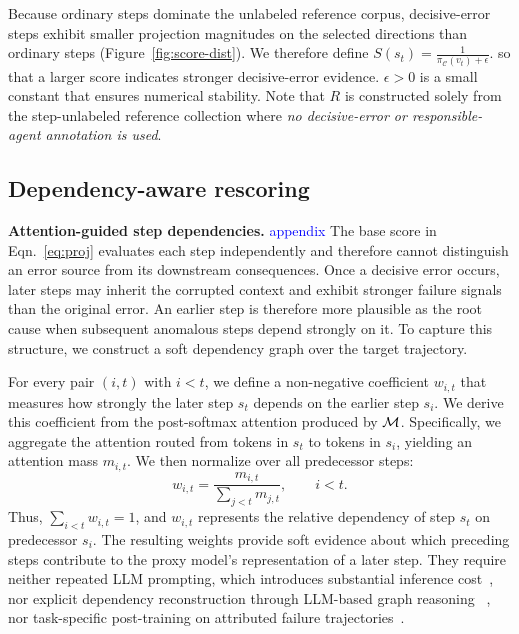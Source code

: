 \noindent Because ordinary steps dominate the unlabeled reference corpus, decisive-error steps exhibit smaller projection magnitudes on
the selected directions than ordinary steps (Figure~\ref{fig:score-dist}).
We therefore define
$ 
S(s_t)
=
\frac{1}{\pi_{\mathcal C}(v_t)+\epsilon}.
$  so that a larger score indicates stronger decisive-error
evidence. $\epsilon>0$ is a small constant that ensures numerical stability. Note that $R$ is constructed solely from the step-unlabeled reference
collection where \textit{no decisive-error or responsible-agent annotation is used}.


\subsection{Dependency-aware rescoring}
\label{sec:method:weights}

\textbf{Attention-guided step dependencies.} \textcolor{blue}{appendix} The base score in Eqn.~\ref{eq:proj} evaluates each step independently
and therefore cannot distinguish an error source from its downstream
consequences.
Once a decisive error occurs, later steps may inherit the corrupted
context and exhibit stronger failure signals than the original error.
An earlier step is therefore more plausible as the root cause when
subsequent anomalous steps depend strongly on it.
To capture this structure, we construct a soft dependency graph over
the target trajectory.



For every pair $(i,t)$ with $i<t$, we define a non-negative coefficient
$w_{i,t}$ that measures how strongly the later step $s_t$ depends on the
earlier step $s_i$.
We derive this coefficient from the post-softmax attention produced by
$\mathcal{M}$. Specifically, we aggregate the attention routed from tokens in $s_t$ to
tokens in $s_i$, yielding
an attention mass $m_{i,t}$.
We then normalize over all predecessor steps:
\begin{equation}
    w_{i,t}
    =
    \frac{m_{i,t}}
         {\sum_{j<t}m_{j,t}},
    \qquad i<t.
    \label{eq:dependency-weight}
\end{equation}
Thus, $\sum_{i<t}w_{i,t}=1$, and $w_{i,t}$ represents the relative
dependency of step $s_t$ on predecessor $s_i$. The resulting weights provide soft evidence about which preceding
steps contribute to the proxy model's representation of a later step. They require neither repeated LLM prompting, which introduces
substantial inference cost~\citep{whoandwhen,oat}, nor explicit
dependency reconstruction through LLM-based graph reasoning
~\citep{falat,chief}, nor task-specific post-training on attributed
failure trajectories~\citep{agentracer,graphtracer}.






